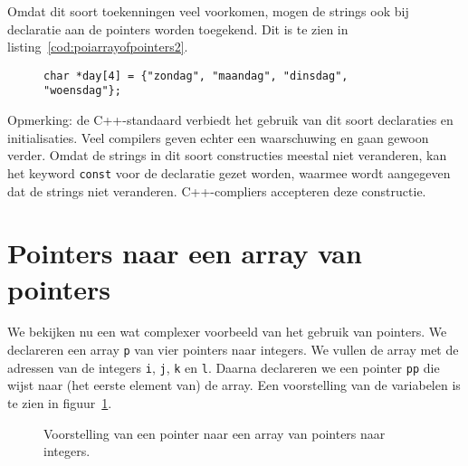 Omdat dit soort toekenningen veel voorkomen, mogen de strings ook bij declaratie aan de pointers worden toegekend. Dit is te zien in listing~\ref{cod:poiarrayofpointers2}.

\begin{figure}[!ht]
\begin{lstlisting}[caption=Een array van pointers naar strings met initialisatie.,label=cod:poiarrayofpointers2]
char *day[4] = {"zondag", "maandag", "dinsdag", "woensdag"};
\end{lstlisting}
\end{figure}

Opmerking: de C++-standaard verbiedt het gebruik van dit soort declaraties en initialisaties. Veel compilers geven echter een waarschuwing en gaan gewoon verder. Omdat de strings in dit soort constructies meestal niet veranderen, kan het keyword \texttt{const} voor de declaratie gezet worden, waarmee wordt aangegeven dat de strings niet veranderen. C++-compliers accepteren deze constructie.


\section{Pointers naar een array van pointers}
\label{sec:pointersnaareenarrayvanpointers}

We bekijken nu een wat complexer voorbeeld van het gebruik van pointers. We declareren een array \texttt{p} van vier pointers naar integers. We vullen de array met de adressen van de integers \texttt{i}, \texttt{j}, \texttt{k} en \texttt{l}. Daarna declareren we een pointer \texttt{pp} die wijst naar (het eerste element van) de array. Een voorstelling van de variabelen is te zien in figuur~\ref{fig:poipointertoarrayofpointers}.

\begin{figure}[!ht]
\centering
{}
\caption{Voorstelling van een pointer naar een array van pointers naar integers.}
\label{fig:poipointertoarrayofpointers}
\end{figure}

